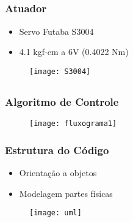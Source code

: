 \documentclass{beamer}
\begin{document}
\subsection{}
\begin{frame}
  \frametitle{Atuador}
  \begin{itemize}
    \item Servo Futaba S3004
    \item 4.1 kgf-cm a 6V (0.4022 Nm)
  \end{itemize}
\begin{figure}[ht]
 \begin{center}
  \texttt{[image: S3004]}
 \end{center}
\end{figure}
\end{frame}

\subsection{}
\begin{frame}
\begin{figure}
 \centering
   \hfil
   \hfil
\end{figure}
\end{frame}



\subsection{}
\begin{frame}
 \frametitle{Algoritmo de Controle}
\end{frame}

\begin{frame}[plain]
  \begin{figure}
    \begin{center}
      \texttt{[image: fluxograma1]}
    \end{center}
  \end{figure}
\end{frame}

\begin{frame}
  \frametitle{Estrutura do Código}
  \begin{itemize}
    \item Orientação a objetos
    \item Modelagem partes físicas
  \end{itemize}
  \begin{figure}[h!]
    \begin{center}
      \texttt{[image: uml]}
    \end{center}
  \end{figure}
\end{frame}
\end{document}
